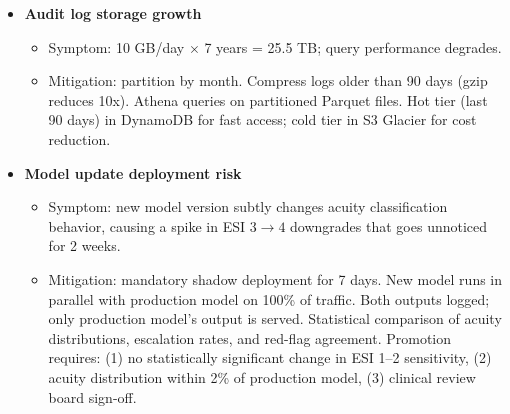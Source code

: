 \begin{itemize}
  \item \textbf{Audit log storage growth}
  \begin{itemize}
    \item Symptom: 10 GB/day $\times$ 7 years = 25.5 TB; query performance degrades.
    \item Mitigation: partition by month. Compress logs older than 90 days (gzip reduces 10x). Athena queries on partitioned Parquet files. Hot tier (last 90 days) in DynamoDB for fast access; cold tier in S3 Glacier for cost reduction.
  \end{itemize}

  \item \textbf{Model update deployment risk}
  \begin{itemize}
    \item Symptom: new model version subtly changes acuity classification behavior, causing a spike in ESI $3\rightarrow4$ downgrades that goes unnoticed for 2 weeks.
    \item Mitigation: mandatory shadow deployment for 7 days. New model runs in parallel with production model on 100\% of traffic. Both outputs logged; only production model's output is served. Statistical comparison of acuity distributions, escalation rates, and red-flag agreement. Promotion requires: (1) no statistically significant change in ESI 1--2 sensitivity, (2) acuity distribution within 2\% of production model, (3) clinical review board sign-off.
  \end{itemize}
\end{itemize}

